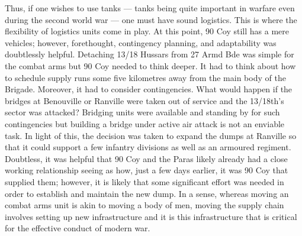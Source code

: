 \documentclass[noraggedright]{turabian-researchpaper}
\begin{document}
Thus, if one wishes to use tanks --- tanks being quite important in warfare
even during the second world war --- one must have sound logistics.  This is
where the flexibility of logistics units come in play.  At this point, 90 Coy
still has a mere %
vehicles; however, forethought, contingency planning, and adaptability was
doubtlessly helpful.  Detaching 13/18 Hussars from 27 Armd Bde was simple for
the combat arms but 90 Coy needed to think deeper.  It had to think about how
to schedule supply runs some five kilometres away from the main body of the 
Brigade.  Moreover, it had to consider contingencies.  What would happen if
the bridges at Benouville or Ranville were taken out of service and the 
13/18th's sector was attacked?  Bridging units were available and standing by
for such contingencies but building a bridge under active air attack is not
an enviable task.  In light of this, the decision was taken to expand the
dumps at Ranville so that it could support a few infantry divisions as well as
an armoured regiment. Doubtless, it was helpful that 90 Coy and the Paras 
likely already had a close working relationship seeing as how, just a few
days earlier, it was 90 Coy that supplied them; however, it is likely that
some significant effort was needed in order to establish and maintain the
new dump.  In a sense, whereas moving an combat arms unit is akin to moving
a body of men, moving the supply chain involves setting up new infrastructure
and it is this infrastructure that is critical for the effective conduct of 
modern war.


\end{document}
